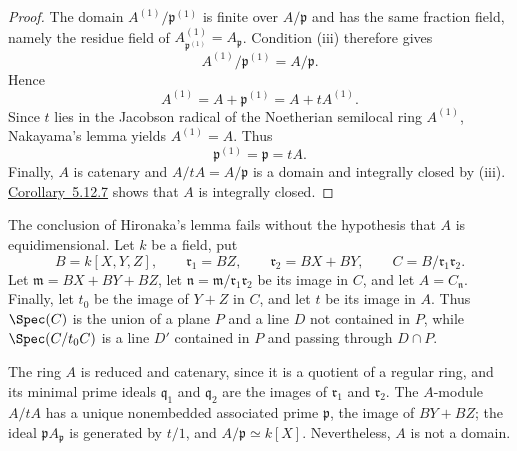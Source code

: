 \begin{proof}
The domain $A^{(1)}/\mathfrak p^{(1)}$ is finite over
$A/\mathfrak p$ and has the same fraction field, namely the
residue field of
$A^{(1)}_{\mathfrak p^{(1)}}=A_{\mathfrak p}$.  Condition
{\rm(iii)} therefore gives
\[
  A^{(1)}/\mathfrak p^{(1)}=A/\mathfrak p.
\]
Hence
\[
  A^{(1)}=A+\mathfrak p^{(1)}=A+tA^{(1)}.
\]
Since $t$ lies in the Jacobson radical of the Noetherian
semilocal ring $A^{(1)}$, Nakayama's lemma yields
$A^{(1)}=A$.  Thus
\[
  \mathfrak p^{(1)}=\mathfrak p=tA.
\]
Finally, $A$ is catenary and
$A/tA=A/\mathfrak p$ is a domain and integrally closed by
{\rm(iii)}.  {\hyperref[IV.5.12.7]{Corollary~5.12.7}} shows that $A$ is integrally
closed.
\end{proof}

\begin{remark}[5.12.9]
\label{IV.5.12.9}
The conclusion of Hironaka's lemma fails without the hypothesis
that $A$ is equidimensional.  Let $k$ be a field, put
\[
  B=k[X,Y,Z],\qquad
  \mathfrak r_1=BZ,\qquad
  \mathfrak r_2=BX+BY,\qquad
  C=B/\mathfrak r_1\mathfrak r_2.
\]
Let $\mathfrak m=BX+BY+BZ$, let
$\mathfrak n=\mathfrak m/\mathfrak r_1\mathfrak r_2$ be its
image in $C$, and let $A=C_{\mathfrak n}$.  Finally, let $t_0$
be the image of $Y+Z$ in $C$, and let $t$ be its image in $A$.
Thus $\Spec(C)$ is the union of a plane $P$ and a line $D$ not
contained in $P$, while $\Spec(C/t_0C)$ is a line $D'$ contained
in $P$ and passing through $D\cap P$.

The ring $A$ is reduced and catenary, since it is a quotient of a
regular ring, and its minimal prime ideals $\mathfrak q_1$ and
$\mathfrak q_2$ are the images of $\mathfrak r_1$ and
$\mathfrak r_2$.  The $A$-module $A/tA$ has a unique
nonembedded associated prime $\mathfrak p$, the image of
$BY+BZ$; the ideal $\mathfrak pA_{\mathfrak p}$ is generated by
$t/1$, and $A/\mathfrak p\simeq k[X]$.  Nevertheless, $A$ is
not a domain.
\end{remark}

